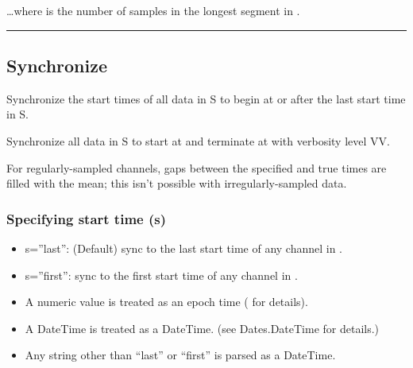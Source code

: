 \documentclass[letterpaper,11pt,english]{sphinxmanual}
\begin{document}
…where  is the number of samples in the longest segment in .


\bigskip\hrule\bigskip



\subsection{Synchronize}
\label{\detokenize{src/Processing/processing:synchronize}}

\begin{fulllineitems}
\end{fulllineitems}


Synchronize the start times of all data in S to begin at or after the last
start time in S.


\begin{fulllineitems}
\end{fulllineitems}


Synchronize all data in S to start at  and terminate at  with verbosity level VV.

For regularly-sampled channels, gaps between the specified and true times
are filled with the mean; this isn’t possible with irregularly-sampled data.


\subsubsection{Specifying start time (s)}
\label{\detokenize{src/Processing/processing:specifying-start-time-s}}\begin{itemize}
\item {} 
s=”last”: (Default) sync to the last start time of any channel in .

\item {} 
s=”first”: sync to the first start time of any channel in .

\item {} 
A numeric value is treated as an epoch time ( for details).

\item {} 
A DateTime is treated as a DateTime. (see Dates.DateTime for details.)

\item {} 
Any string other than “last” or “first” is parsed as a DateTime.

\end{itemize}
\end{document}
